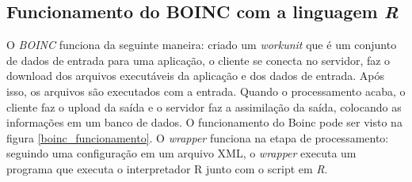 \documentclass[b1]{sciposter}
\begin{document}
\begin{multicols}{2}
\section{Funcionamento do BOINC com a linguagem \textit{R}}

O \textit{BOINC} funciona da seguinte maneira: criado um \textit{workunit} que é um conjunto de dados de entrada para uma aplicação, 
o cliente se conecta no servidor, faz o download dos arquivos executáveis da aplicação e dos dados de entrada. Após isso, 
os arquivos são executados com a entrada. Quando o processamento acaba, o cliente faz o upload da saída
e o servidor faz a assimilação da saída, colocando as informações em um banco de dados. O funcionamento do Boinc pode ser visto 
na figura \ref{boinc_funcionamento}. O \textit{wrapper} funciona na etapa de processamento: seguindo
uma configuração em um arquivo XML, o \textit{wrapper} executa um programa que executa o interpretador R junto com
o script em \textit{R}.



\end{multicols}
\end{document}
